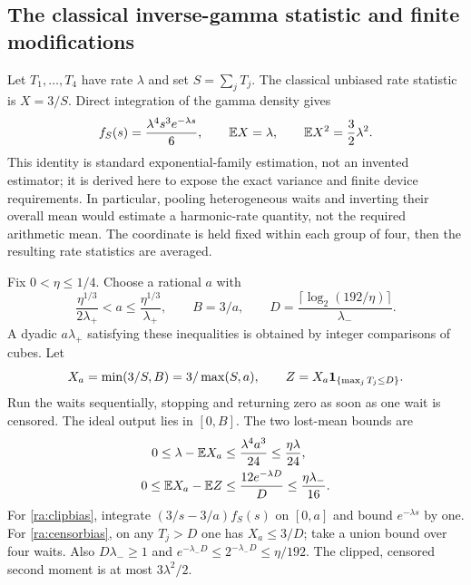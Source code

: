 \subsection{The classical inverse-gamma statistic and finite modifications}
Let $T_1,\ldots,T_4$ have rate $\lambda$ and set $S=\sum_jT_j$.
The classical unbiased rate statistic is $X=3/S$. Direct integration of
the gamma density gives
\begin{equation}
 f_S(s)=\frac{\lambda^4s^3e^{-\lambda s}}6,
 \qquad \mathbb E X=\lambda,
 \qquad \mathbb E X^2=\frac32\lambda^2.
 \label{ra:gamma}
\end{equation}
This identity is standard exponential-family estimation, not an invented
estimator; it is derived here to expose the exact variance and finite
device requirements. In particular, pooling heterogeneous waits and
inverting their overall mean would estimate a harmonic-rate quantity,
not the required arithmetic mean. The coordinate is held fixed within
each group of four, then the resulting rate statistics are averaged.

Fix $0<\eta\le1/4$. Choose a rational $a$ with
\begin{equation}
 \frac{\eta^{1/3}}{2\lambda_+}<a\le
 \frac{\eta^{1/3}}{\lambda_+},\qquad B=3/a,
 \qquad D=\frac{\lceil\log_2(192/\eta)\rceil}{\lambda_-}.
 \label{ra:clipcap}
\end{equation}
A dyadic $a\lambda_+$ satisfying these inequalities is obtained by
integer comparisons of cubes. Let
\[
 X_a=\min(3/S,B)=3/\max(S,a),\qquad
 Z=X_a\mathbf1_{\{\max_jT_j\le D\}}.
\]
Run the waits sequentially, stopping and returning zero as soon as one
wait is censored. The ideal output lies in $[0,B]$. The two lost-mean
bounds are
\begin{align}
 0\le\lambda-\mathbb E X_a
 &\le\frac{\lambda^4a^3}{24}
 \le\frac{\eta\lambda}{24},\label{ra:clipbias}\\
 0\le\mathbb E X_a-\mathbb E Z
 &\le\frac{12e^{-\lambda D}}D
 \le\frac{\eta\lambda_-}{16}.
 \label{ra:censorbias}
\end{align}
For \eqref{ra:clipbias}, integrate
$(3/s-3/a)f_S(s)$ on $[0,a]$ and bound $e^{-\lambda s}$ by one.
For \eqref{ra:censorbias}, on any $T_j>D$ one has $X_a\le3/D$;
take a union bound over four waits. Also $D\lambda_-\ge1$ and
$e^{-\lambda_-D}\le2^{-\lambda_-D}\le\eta/192$.
The clipped, censored second moment is at most $3\lambda^2/2$.

